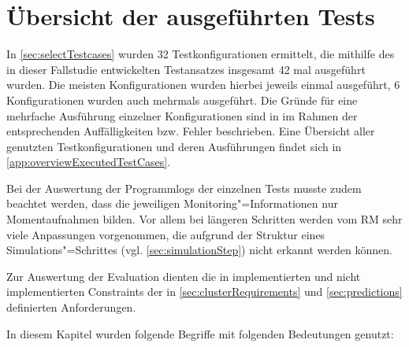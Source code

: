 \section{Übersicht der ausgeführten Tests}
\label{sec:overviewExecTestCases}

In \autoref{sec:selectTestcases} wurden 32 Testkonfigurationen ermittelt, die mithilfe des in dieser Fallstudie entwickelten Testansatzes insgesamt 42 mal ausgeführt wurden.
Die meisten Konfigurationen wurden hierbei jeweils einmal ausgeführt, 6 Konfigurationen wurden auch mehrmals ausgeführt.
Die Gründe für eine mehrfache Ausführung einzelner Konfigurationen sind in im Rahmen der entsprechenden Auffälligkeiten bzw. Fehler beschrieben.
Eine Übersicht aller genutzten Testkonfigurationen und deren Ausführungen findet sich in \autoref{app:overviewExecutedTestCases}.

Bei der Auswertung der Programmlogs der einzelnen Tests musste zudem beachtet werden, dass die jeweiligen Monitoring"=Informationen nur Momentaufnahmen bilden.
Vor allem bei längeren Schritten werden vom \ac{RM} sehr viele Anpassungen vorgenommen, die aufgrund der Struktur eines Simulations"=Schrittes (vgl. \autoref{sec:simulationStep}) nicht erkannt werden können.

Zur Auswertung der Evaluation dienten die in  implementierten und nicht implementierten Constraints der in \autoref{sec:clusterRequirements} und \autoref{sec:predictions} definierten Anforderungen.

In diesem Kapitel wurden folgende Begriffe mit folgenden Bedeutungen genutzt:

